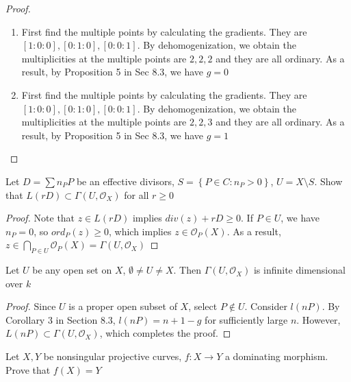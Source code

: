 \documentclass{solution}
\begin{document}
\begin{proof}
    \begin{enumerate}
        \item First find the multiple points by calculating the gradients. They are $[1:0:0], [0:1:0], [0:0:1]$. By dehomogenization, we obtain the multiplicities at the multiple points are $2, 2, 2$ and they are all ordinary. As a result, by Proposition 5 in Sec 8.3, we have $g = 0$
        \item First find the multiple points by calculating the gradients. They are $[1:0:0], [0:1:0], [0:0:1]$. By dehomogenization, we obtain the multiplicities at the multiple points are $2, 2, 3$ and they are all ordinary. As a result, by Proposition 5 in Sec 8.3, we have $g = 1$
    \end{enumerate}
\end{proof}

\begin{problem}{8.15}
    Let $D = \sum n_P P$ be an effective divisors, $S = \left\lbrace P \in C: n_P \gt 0 \right\rbrace$, $U = X \setminus S$. Show that $L(rD) \subset \Gamma(U, \mathcal{O}_{X})$ for all $r \ge 0$
\end{problem}

\begin{proof}
    Note that $z \in L(rD)$ implies $div(z) + rD \ge 0$. If $P \in U$, we have $n_P = 0$, so $ord_P(z) \ge 0$, which implies $z \in \mathcal{O}_{P}(X)$. As a result, $z \in \bigcap\limits_{P \in U} \mathcal{O}_{P}(X) = \Gamma(U, \mathcal{O}_{X})$
\end{proof}

\begin{problem}{8.16}
    Let $U$ be any open set on $X$, $\emptyset \ne U \ne X$. Then $\Gamma(U, \mathcal{O}_{X})$ is infinite dimensional over $k$
\end{problem}

\begin{proof}
    Since $U$ is a proper open subset of $X$, select $P \notin U$. Consider $l(nP)$. By Corollary 3 in Section 8.3, $l(nP) = n + 1 - g$ for sufficiently large $n$. However, $L(nP) \subset \Gamma(U, \mathcal{O}_{X})$, which completes the proof.
\end{proof}

\begin{problem}{8.17}
    Let $X, Y$ be nonsingular projective curves, $f: X \rightarrow Y$ a dominating morphism. Prove that $f(X) = Y$
\end{problem}
\end{document}
